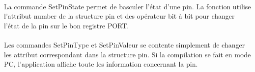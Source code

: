 \paragraph{}
La commande SetPinState permet de basculer l'état d'une pin. La fonction utilise l'attribut number de la structure pin et des opérateur bit à bit pour changer l'état de la pin sur le bon registre PORT.

\paragraph{}
Les commandes SetPinType et SetPinValeur se contente simplement de changer les attribut correspondant dans la structure pin. Si la compilation se fait en mode PC, l'application affiche toute les information concernant la pin.
